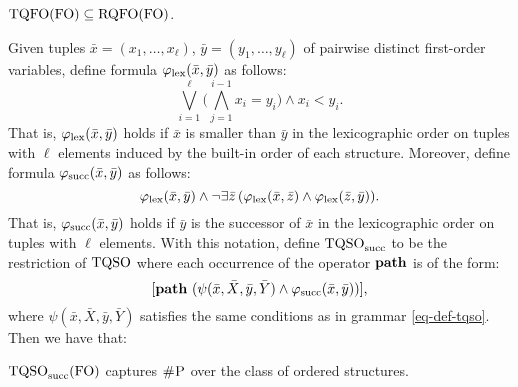 \begin{theorem} \label{tqfo-subseteq}
	${\rm TQFO}({\rm FO}) \subseteq {\rm RQFO}({\rm FO})$.
\end{theorem}
Given tuples $\bar x = (x_1, \ldots, x_\ell)$, $\bar y = (y_1, \ldots, y_\ell)$ of pairwise distinct first-order variables, define formula $\varphi_{\text{\rm lex}}(\bar x, \bar y)$ as follows:
$$
\bigvee_{i = 1}^\ell \bigg(\bigwedge_{j = 1}^{i -1} x_i = y_i\bigg) \wedge x_i < y_i.
$$
That is, $\varphi_{\text{\rm lex}}(\bar x, \bar y)$ holds if $\bar x$ is smaller than $\bar y$ in the lexicographic order on tuples with $\ell$ elements induced by the built-in order of each structure. Moreover, define formula $\varphi_{\text{\rm succ}}(\bar x, \bar y)$ as follows:
$$
\varphi_{\text{\rm lex}}(\bar x, \bar y) \wedge \neg \exists \bar z \, (\varphi_{\text{\rm lex}}(\bar x, \bar z) \wedge \varphi_{\text{\rm lex}}(\bar z, \bar y)).
$$
That is, $\varphi_{\text{\rm succ}}(\bar x, \bar y)$ holds if $\bar y$ is the successor of $\bar x$ in the lexicographic order on tuples with $\ell$ elements.
With this notation, define ${\rm TQSO}_{\rm succ}$ to be the restriction of ${\rm TQSO}$ where each occurrence of the operator ${\bf path}$ is of the form:
$$
[{\bf path} \,\, (\psi(\bar{x}, \bar{X},\bar{y}, \bar{Y}) \wedge \varphi_{\text{\rm succ}}(\bar x, \bar y))],
$$
where $\psi(\bar{x}, \bar{X},\bar{y}, \bar{Y})$ satisfies the same conditions as in grammar \eqref{eq-def-tqso}. Then we have that:
\begin{theorem} \label{tqfo-shl}
	${\rm TQSO}_{\rm succ}({\rm FO})$ captures $\text{\sc \#P}$ over the class of ordered structures.
\end{theorem}

%


